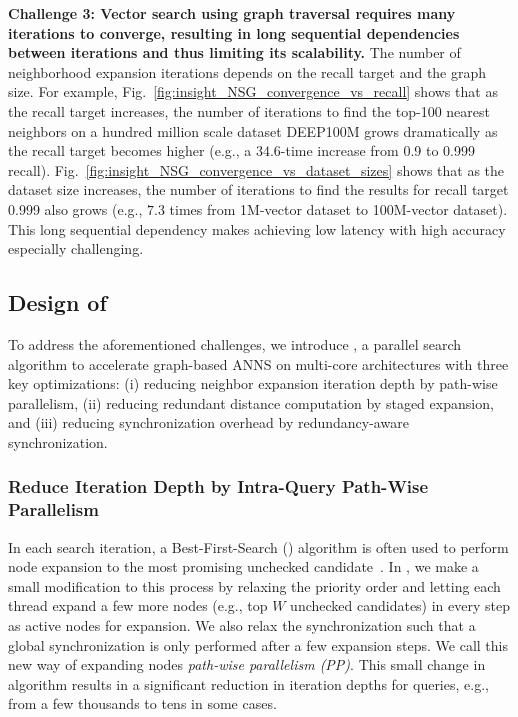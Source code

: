\textbf{Challenge 3: Vector search using graph traversal requires many iterations to converge, resulting in long sequential dependencies between iterations and thus limiting its scalability.}
The number of neighborhood expansion iterations depends on the recall target and the graph size. For example, 
Fig.~\ref{fig:insight_NSG_convergence_vs_recall} shows that as the recall target increases, the number of iterations to find the top-100 nearest neighbors on a hundred million scale dataset {DEEP100M} grows dramatically as the recall target becomes higher (e.g., a $34.6$-time increase from 0.9 to 0.999 recall). 
Fig.~\ref{fig:insight_NSG_convergence_vs_dataset_sizes} shows that as the dataset size increases, the number of iterations to find the results for recall target 0.999 also grows  (e.g., $7.3$ times from 1M-vector dataset to 100M-vector dataset). This long sequential dependency makes achieving low latency with high accuracy especially challenging. 

\subsection{Design of \Hammer}
\label{subsec:iqan-design}

To address the aforementioned challenges, we introduce \Hammer, a parallel search algorithm to accelerate graph-based ANNS on multi-core architectures with three key optimizations: (i) reducing neighbor expansion iteration depth by path-wise parallelism, (ii) reducing redundant distance computation by staged expansion, and (iii) reducing synchronization overhead by redundancy-aware synchronization. 

\subsubsection{Reduce Iteration Depth by Intra-Query Path-Wise Parallelism} 
\label{subsec:path-wise}


In each search iteration, a Best-First-Search (\SeqShortName) algorithm is often used to perform node expansion to the most promising unchecked candidate~\cite{hnsw,nsg}. In \Hammer, we make a small modification to this process by relaxing the priority order and letting each thread expand a few more nodes (e.g., top $W$ unchecked candidates) in every step as active nodes for expansion. We also relax the synchronization such that a global synchronization is only performed after a few expansion steps. We call this new way of expanding nodes \emph{path-wise parallelism (PP)}. This small change in algorithm results in a significant reduction in iteration depths for queries, e.g., from a few {thousands} to {tens} in some cases.

